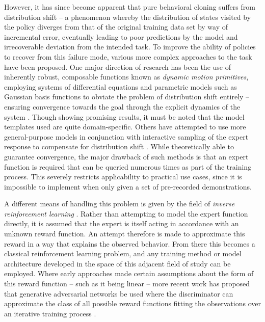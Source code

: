 \documentclass{article}
\begin{document}
However, it has since become apparent that pure behavioral cloning suffers from distribution shift -- a phenomenon whereby the distribution of states visited by the policy diverges from that of the original training data set by way of incremental error, eventually leading to poor predictions by the model and irrecoverable deviation from the intended task. To improve the ability of policies to recover from this failure mode, various more complex approaches to the task have been proposed. One major direction of research has been the use of inherently robust, composable functions known as \emph{dynamic motion primitives}, employing systems of differential equations and parametric models such as Gaussian basis functions to obviate the problem of distribution shift entirely -- ensuring convergence towards the goal through the explicit dynamics of the system \citep{pastor2009learning}. Though showing promising results, it must be noted that the model templates used are quite domain-specific. Others have attempted to use more general-purpose models in conjunction with interactive sampling of the expert response to compensate for distribution shift \citep{ross2011no}. While theoretically able to guarantee convergence, the major drawback of such methods is that an expert function is required that can be queried numerous times as part of the training process. This severely restricts applicability to practical use cases, since it is impossible to implement when only given a set of pre-recorded demonstrations.

A different means of handling this problem is given by the field of \emph{inverse reinforcement learning} \citep{abbeel2004apprenticeship}. Rather than attempting to model the expert function directly, it is assumed that the expert is itself acting in accordance with an unknown reward function. An attempt therefore is made to approximate this reward in a way that explains the observed behavior. From there this becomes a classical reinforcement learning problem, and any training method or model architecture developed in the space of this adjacent field of study can be employed. Where early approaches made certain assumptions about the form of this reward function -- such as it being linear -- more recent work has proposed that generative adversarial networks be used where the discriminator can approximate the class of all possible reward functions fitting the observations over an iterative training process \citep{ho2016generative}.
\end{document}
